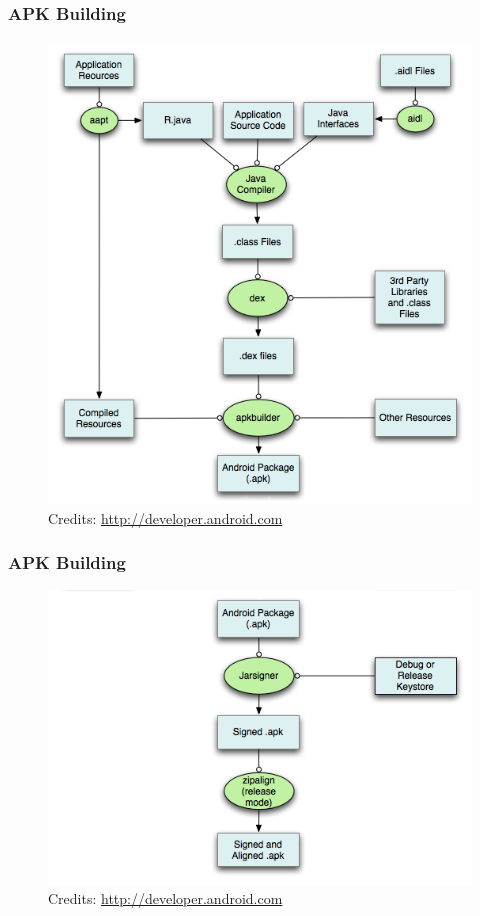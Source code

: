\begin{frame}
  \frametitle{APK Building}
  \begin{figure}[h!]
    \centering
    \includegraphics[height=0.8\textheight]{slides/android-application-apk/apk-building-1.png}\\
    {
      \tiny
      Credits: \url{http://developer.android.com}
    }
  \end{figure}
\end{frame}

\begin{frame}
  \frametitle{APK Building}
  \begin{figure}[h!]
    \centering
    \includegraphics[height=0.8\textheight]{slides/android-application-apk/apk-building-2.png}\\
    {
      \tiny
      Credits: \url{http://developer.android.com}
    }
  \end{figure}
\end{frame}
